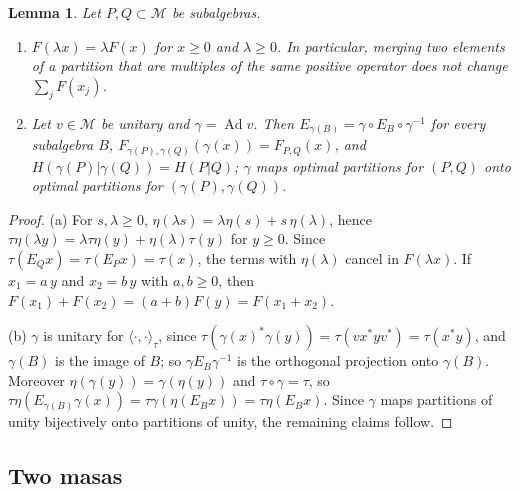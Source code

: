 \documentclass[11pt]{article}
\DeclareMathOperator{\Ad}{Ad}
\newcommand{\M}{\mathcal{M}}
\theoremstyle{plain}
\newtheorem{lemma}[theorem]{Lemma}
\theoremstyle{definition}
\theoremstyle{remark}
\begin{document}
\begin{lemma}\label{lem:F}
Let $P,Q\subset\M$ be subalgebras.
\begin{enumerate}
\item[(a)] $F(\lambda x)=\lambda F(x)$ for $x\ge0$ and $\lambda\ge0$. In particular, merging two elements of a partition
that are multiples of the same positive operator does not change $\sum_jF(x_j)$.
\item[(b)] Let $v\in\M$ be unitary and $\gamma=\Ad v$. Then $E_{\gamma(B)}=\gamma\circ E_B\circ\gamma^{-1}$ for every subalgebra
$B$, $F_{\gamma(P),\gamma(Q)}(\gamma(x))=F_{P,Q}(x)$, and $H(\gamma(P)|\gamma(Q))=H(P|Q)$; $\gamma$ maps optimal partitions for
$(P,Q)$ onto optimal partitions for $(\gamma(P),\gamma(Q))$.
\end{enumerate}
\end{lemma}
\begin{proof}
(a) For $s,\lambda\ge0$, $\eta(\lambda s)=\lambda\eta(s)+s\,\eta(\lambda)$, hence $\tau\eta(\lambda y)=\lambda\tau\eta(y)+\eta(\lambda)\tau(y)$
for $y\ge0$. Since $\tau(E_Qx)=\tau(E_Px)=\tau(x)$, the terms with $\eta(\lambda)$ cancel in $F(\lambda x)$. If
$x_1=a\,y$ and $x_2=b\,y$ with $a,b\ge0$, then $F(x_1)+F(x_2)=(a+b)F(y)=F(x_1+x_2)$.

(b) $\gamma$ is unitary for $\langle\cdot,\cdot\rangle_\tau$, since $\tau(\gamma(x)^*\gamma(y))=\tau(vx^*yv^*)=\tau(x^*y)$, and
$\gamma(B)$ is the image of $B$; so $\gamma E_B\gamma^{-1}$ is the orthogonal projection onto $\gamma(B)$. Moreover
$\eta(\gamma(y))=\gamma(\eta(y))$ and $\tau\circ\gamma=\tau$, so $\tau\eta(E_{\gamma(B)}\gamma(x))=\tau\gamma(\eta(E_Bx))=\tau\eta(E_Bx)$.
Since $\gamma$ maps partitions of unity bijectively onto partitions of unity, the remaining claims follow.
\end{proof}

\subsection{Two masas}
\end{document}

